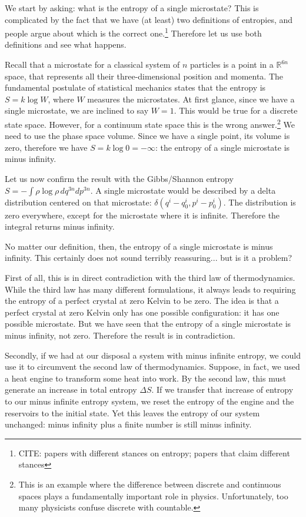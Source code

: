 \documentclass[10pt,twocolumn, nofootinbib]{revtex4-2}
\begin{document}
We start by asking: what is the entropy of a single microstate? This is complicated by the fact that we have (at least) two definitions of entropies, and people argue about which is the correct one.\footnote{CITE: papers with different stances on entropy; papers that claim different stances} Therefore let us use both definitions and see what happens.

Recall that a microstate for a classical system of $n$ particles is a point in a $\mathbb{R}^{6n}$ space, that represents all their three-dimensional position and momenta. The fundamental postulate of statistical mechanics states that the entropy is $S = k \log W$, where $W$ measures the  microstates. At first glance, since we have a single microstate, we are inclined to say $W = 1$. This would be true for a discrete state space. However, for a continuum state space this is the wrong answer.\footnote{This is an example where the difference between discrete and continuous spaces plays a fundamentally important role in physics. Unfortunately, too many physicists confuse discrete with countable.} We need to use the phase space volume. Since we have a single point, its volume is zero, therefore we have $S = k \log 0 = -\infty$: the entropy of a single microstate is minus infinity.

Let us now confirm the result with the Gibbs/Shannon entropy $S = -\int \rho \log \rho \, dq^{3n} dp^{3n}$. A single microstate would be described by a delta distribution centered on that microstate: $\delta(q^i-q^i_0, p^i-p^i_0)$. The distribution is zero everywhere, except for the microstate where it is infinite. Therefore the integral returns minus infinity.

No matter our definition, then, the entropy of a single microstate is minus infinity. This certainly does not sound terribly reassuring... but is it a problem?

First of all, this is in direct contradiction with the third law of thermodynamics. While the third law has many different formulations, it always leads to requiring the entropy of a perfect crystal at zero Kelvin to be zero. The idea is that a perfect crystal at zero Kelvin only has one possible configuration: it has one possible microstate. But we have seen that the entropy of a single microstate is minus infinity, not zero. Therefore the result is in contradiction.

Secondly, if we had at our disposal a system with minus infinite entropy, we could use it to circumvent the second law of thermodynamics. Suppose, in fact, we used a heat engine to transform some heat into work. By the second law, this must generate an increase in total entropy $\Delta S$. If we transfer that increase of entropy to our minus infinite entropy system, we reset the entropy of the engine and the reservoirs to the initial state. Yet this leaves the entropy of our system unchanged: minus infinity plus a finite number is still minus infinity.
\end{document}
